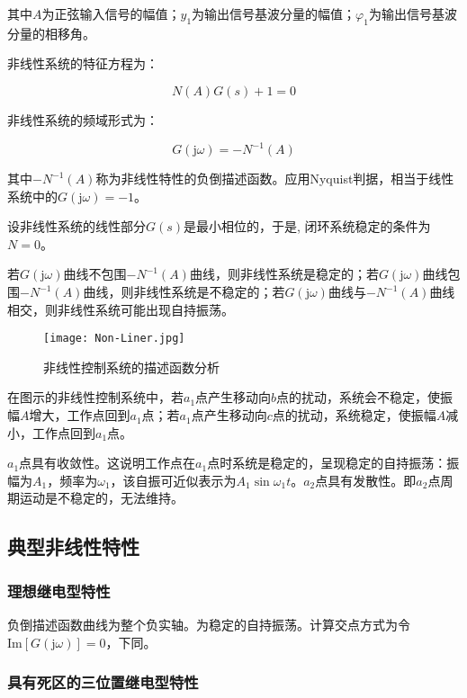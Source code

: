 \documentclass[cn, blue, normal, 12pt]{elegantnote}
\begin{document}
其中$A$为正弦输入信号的幅值；$y_1$为输出信号基波分量的幅值；$\varphi_1$为输出信号基波分量的相移角。

非线性系统的特征方程为：

\begin{equation}
    N(A)G(s)+1=0
\end{equation}

非线性系统的频域形式为：

\begin{equation}
    G(\mathrm{j}\omega)=-N^{-1}(A)
\end{equation}

其中$-N^{-1}(A)$称为非线性特性的负倒描述函数。应用Nyquist判据，相当于线性系统中的$G(\mathrm{j}\omega)=-1$。

设非线性系统的线性部分$G(s)$是最小相位的，于是, 闭环系统稳定的条件为$N=0$。

若$G(\mathrm{j}\omega)$曲线不包围$-N^{-1}(A)$曲线，则非线性系统是稳定的；若$G(\mathrm{j}\omega)$曲线包围$-N^{-1}(A)$曲线，则非线性系统是不稳定的；若$G(\mathrm{j}\omega)$曲线与$-N^{-1}(A)$曲线相交，则非线性系统可能出现自持振荡。

\begin{figure}[htbp]
    \centering
    \texttt{[image: Non-Liner.jpg]}
    \caption{非线性控制系统的描述函数分析}
\end{figure}

在图示的非线性控制系统中，若$a_1$点产生移动向$b$点的扰动，系统会不稳定，使振幅$A$增大，工作点回到$a_1$点；若$a_1$点产生移动向$c$点的扰动，系统稳定，使振幅$A$减小，工作点回到$a_1$点。

$a_1$点具有收敛性。这说明工作点在$a_1$点时系统是稳定的，呈现稳定的自持振荡：振幅为$A_1$，频率为$\omega_1$，该自振可近似表示为$A_1\sin{\omega_1 t}$。$a_2$点具有发散性。即$a_2$点周期运动是不稳定的，无法维持。

\subsection{典型非线性特性}

\subsubsection{理想继电型特性}

负倒描述函数曲线为整个负实轴。为稳定的自持振荡。计算交点方式为令$\mathrm{Im}[G(\mathrm{j}\omega)]=0$，下同。

\subsubsection{具有死区的三位置继电型特性}
\end{document}
